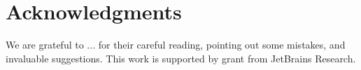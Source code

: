 \section*{Acknowledgments}

We are grateful to ... for their careful reading, pointing out some mistakes, and invaluable suggestions.
This work is supported by grant from JetBrains Research.